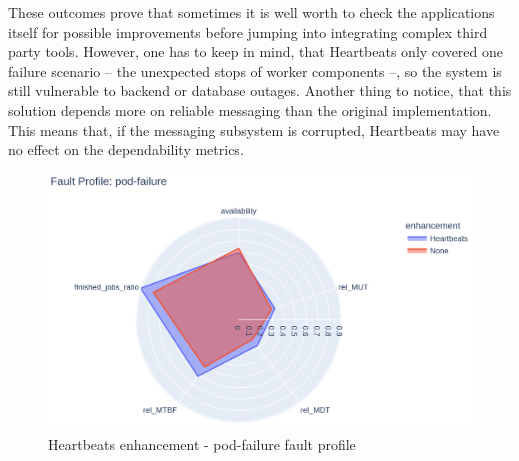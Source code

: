 These outcomes prove that sometimes it is well worth to check the applications itself for possible improvements before jumping into integrating complex third party tools. However, one has to keep in mind, that Heartbeats only covered one failure scenario -- the unexpected stops of worker components --, so the system is still vulnerable to backend or database outages. Another thing to notice, that this solution depends more on reliable messaging than the original implementation. This means that, if the messaging subsystem is corrupted, Heartbeats may have no effect on the dependability metrics.



\begin{figure}[H]
	\centering
	\includegraphics[width=140mm, keepaspectratio]{figures/heartbeats_with_base_pod-failure.png}
	\caption{Heartbeats enhancement - pod-failure fault profile}
	\label{fig:heartbeats-results-pod-failure}
\end{figure}

